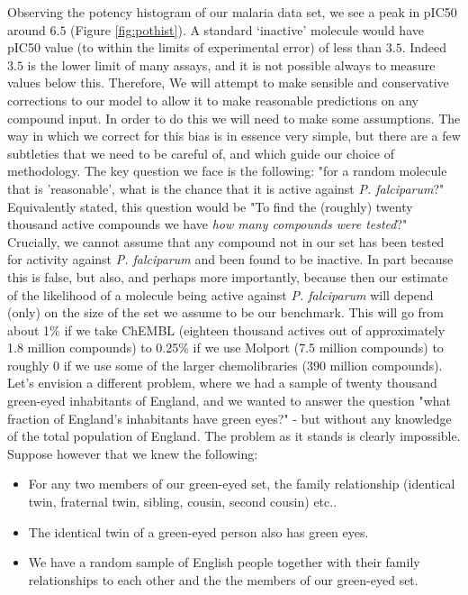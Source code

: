 \documentclass{article}
\begin{document}
Observing the potency histogram of our malaria data set, we see a peak in pIC50 around $6.5$ (Figure \ref{fig:pothist}).  A standard `inactive' molecule would have pIC50 value (to within the limits of experimental error) of less than $3.5$.  Indeed $3.5$ is the lower limit of many assays, and it is not possible always to measure values below this.
\newline
\newline
Therefore, We will attempt to make sensible and conservative corrections to our model to allow it to make reasonable predictions on any compound input.  In order to do this we will need to make some assumptions. The way in which we correct for this bias is in essence very simple, but there are a few subtleties that we need to be careful of, and which guide our choice of methodology.  The key question we face is the following: "for a random molecule that is 'reasonable', what is the chance that it is active against {\it P. falciparum}?"  Equivalently stated, this question would be "To find the (roughly) twenty thousand active compounds we have \textit{how many compounds were tested}?"  Crucially, we cannot assume that any compound not in our set has been tested for activity against {\it P. falciparum} and been found to be inactive.  In part because this is false, but also, and perhaps more importantly, because then our estimate of the likelihood of a molecule being active against {\it P. falciparum} will depend (only) on the size of the set we assume to be our benchmark.  This will go from about 1\% if we take ChEMBL (eighteen thousand actives out of approximately 1.8 million compounds) to 0.25\% if we use Molport (7.5 million compounds) to roughly 0 if we use some of the larger chemolibraries (390 million compounds).
\newline
\newline
Let's envision a different problem, where we had a sample of twenty thousand green-eyed inhabitants of England, and we wanted to answer the question "what fraction of England's inhabitants have green eyes?" - but without any knowledge of the total population of England. The problem as it stands is clearly impossible.  Suppose however that we knew the following:
\begin{itemize}
    \item For any two members of our green-eyed set, the family relationship (identical twin, fraternal twin, sibling, cousin, second cousin) etc..
    \item The identical twin of a green-eyed person also has green eyes.
    \item We have a random sample of English people together with their family relationships to each other and the the members of our green-eyed set.
\end{itemize}
\end{document}
